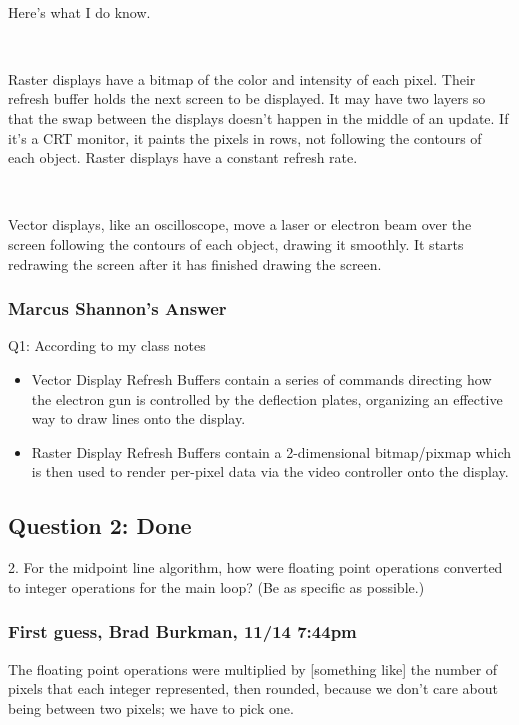 \documentclass[11pt]{article}
\begin{document}
\begin{spacing}{1.2}
\

Here's what I do know.  

\

Raster displays have a bitmap of the color and intensity of each pixel.  Their refresh buffer holds the next screen to be displayed.  It may have two layers so that the swap between the displays doesn't happen in the middle of an update.  If it's a CRT monitor, it paints the pixels in rows, not following the contours of each object.  Raster displays have a constant refresh rate.  

\

Vector displays, like an oscilloscope, move a laser or electron beam over the screen following the contours of each object, drawing it smoothly.  It starts redrawing the screen after it has finished drawing the screen.  

\subsubsection{Marcus Shannon's Answer}

Q1: According to my class notes

\begin{itemize}
    \item Vector Display Refresh Buffers contain a series of commands directing how the electron gun is controlled by the deflection plates, organizing an effective way to draw lines onto the display.
    \item Raster Display Refresh Buffers contain a 2-dimensional bitmap/pixmap which is then used to render per-pixel data via the video controller onto the display.
\end{itemize}

\subsection{Question 2:  Done}
2.  For the midpoint line algorithm, how were floating point operations converted to integer operations for the main loop?  (Be as specific as possible.)

\subsubsection{First guess, Brad Burkman, 11/14 7:44pm}
The floating point operations were multiplied by [something like] the number of pixels that each integer represented, then rounded, because we don't care about being between two pixels; we have to pick one.  


\end{spacing}
\end{document}

